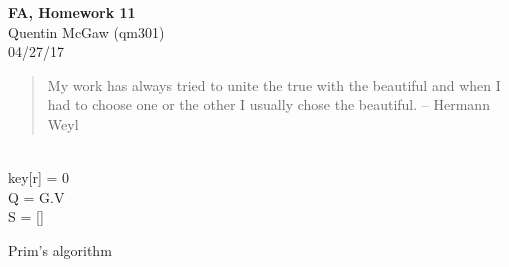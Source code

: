\documentclass[11pt]{article}
\begin{document}
\begin{center} {\Large\bf FA, Homework 11} \\ Quentin McGaw (qm301) \\ 04/27/17
\end{center}

\begin{quote}
My work has always tried to unite the true with the beautiful and
when I had to choose one or the other I usually chose the beautiful.
--  Hermann Weyl
\end{quote}

\begin{algorithm}
\Indm{} \\
\Indp
    key[r] = 0 \\
    Q = G.V \\
    S = [] \\
\caption{Prim's algorithm}
\end{algorithm}
\end{document}

